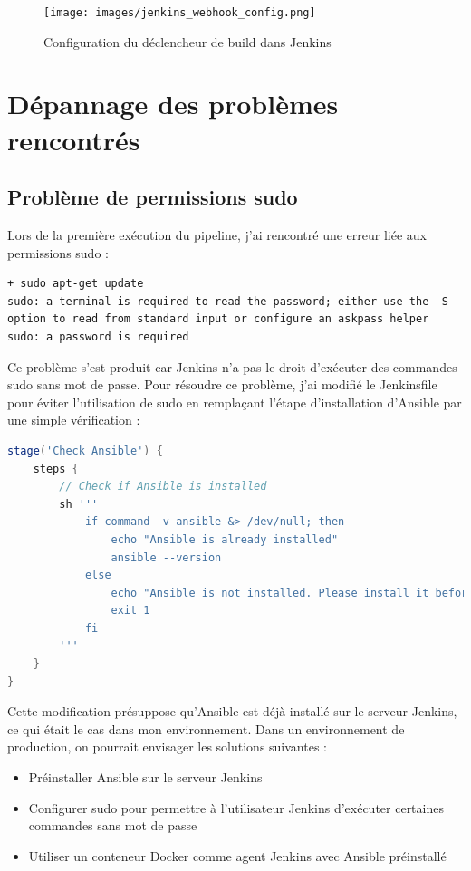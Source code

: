 \documentclass{article}
\begin{document}
\begin{figure}[h]
    \centering
    \texttt{[image: images/jenkins\_webhook\_config.png]}
    \caption{Configuration du déclencheur de build dans Jenkins}
    \label{fig:jenkins_webhook_config}
\end{figure}

\section{Dépannage des problèmes rencontrés}
\subsection{Problème de permissions sudo}

Lors de la première exécution du pipeline, j'ai rencontré une erreur liée aux permissions sudo :

\begin{lstlisting}
+ sudo apt-get update
sudo: a terminal is required to read the password; either use the -S option to read from standard input or configure an askpass helper
sudo: a password is required
\end{lstlisting}

Ce problème s'est produit car Jenkins n'a pas le droit d'exécuter des commandes sudo sans mot de passe. Pour résoudre ce problème, j'ai modifié le Jenkinsfile pour éviter l'utilisation de sudo en remplaçant l'étape d'installation d'Ansible par une simple vérification :

\begin{lstlisting}[language=groovy]
stage('Check Ansible') {
    steps {
        // Check if Ansible is installed
        sh '''
            if command -v ansible &> /dev/null; then
                echo "Ansible is already installed"
                ansible --version
            else
                echo "Ansible is not installed. Please install it before running this pipeline."
                exit 1
            fi
        '''
    }
}
\end{lstlisting}

Cette modification présuppose qu'Ansible est déjà installé sur le serveur Jenkins, ce qui était le cas dans mon environnement. Dans un environnement de production, on pourrait envisager les solutions suivantes :

\begin{itemize}
    \item Préinstaller Ansible sur le serveur Jenkins
    \item Configurer sudo pour permettre à l'utilisateur Jenkins d'exécuter certaines commandes sans mot de passe
    \item Utiliser un conteneur Docker comme agent Jenkins avec Ansible préinstallé
\end{itemize}
\end{document}
